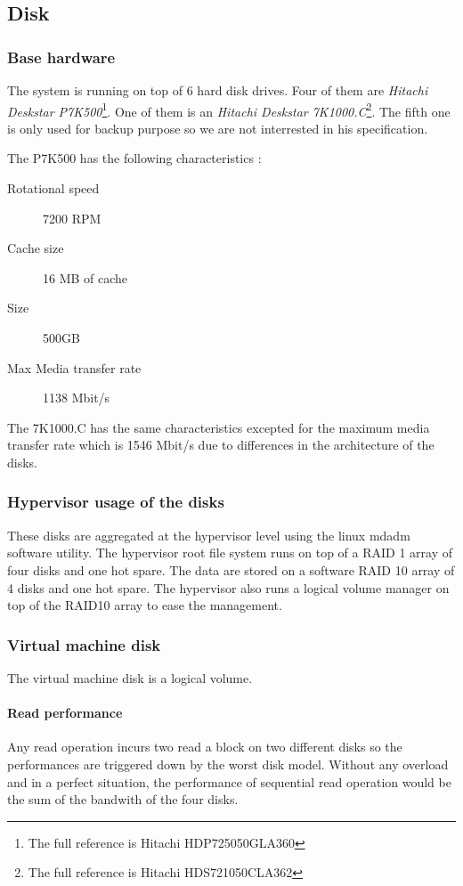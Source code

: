 \subsection{Disk}
\subsubsection{Base hardware}
The system is running on top of 6 hard disk drives.
Four of them are \emph{Hitachi Deskstar P7K500}\footnote{The full reference is
Hitachi HDP725050GLA360}.
One of them is an \emph{Hitachi Deskstar 7K1000.C}\footnote{The full reference
is Hitachi HDS721050CLA362}.
The fifth one is only used for backup purpose so we are not interrested in his
specification.

The P7K500 has the following characteristics \cite{p7k500} :
\begin{description}
\item[Rotational speed] 7200 RPM
\item[Cache size] 16 MB of cache
\item[Size] 500GB
\item[Max Media transfer rate] 1138 Mbit/s
\end{description}
The 7K1000.C has the same characteristics \cite{7K1000.C} excepted for the maximum media transfer
rate which is 1546 Mbit/s due to differences in the architecture of the disks.

\subsubsection{Hypervisor usage of the disks}
These disks are aggregated at the hypervisor level using the linux mdadm
software utility.
The hypervisor root file system runs on top of a RAID 1 array of four disks and
one hot spare.
The data are stored on a software RAID 10 array of 4 disks and one hot spare.
The hypervisor also runs a logical volume manager on top of the RAID10 array to
ease the management.

\subsubsection{Virtual machine disk}
The virtual machine disk is a logical volume.

\paragraph{Read performance}
Any read operation incurs two read a block on two different disks so the
performances are triggered down by the worst disk model.
Without any overload and in a perfect situation, the performance of sequential read
operation would be the sum of the bandwith of the four disks.

